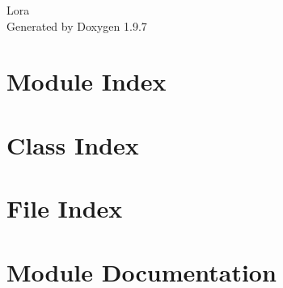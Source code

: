 \documentclass[twoside]{book}
\newcommand{\+}{\discretionary{\mbox{\scriptsize$\hookleftarrow$}}{}{}}
\newcommand{\clearemptydoublepage}{%
    \newpage{\pagestyle{empty}\cleardoublepage}%
  }
\begin{document}
  \raggedbottom
    \hypersetup{pageanchor=false,
                bookmarksnumbered=true,
                pdfencoding=unicode
               }
  \begin{titlepage}
  \vspace*{7cm}
  \begin{center}%
  {\Large Lora}\\
  \vspace*{1cm}
  {\large Generated by Doxygen 1.9.7}\\
  \end{center}
  \end{titlepage}
  \clearemptydoublepage
  \tableofcontents
  \clearemptydoublepage
  \hypersetup{pageanchor=true}



\chapter{Module Index}

\chapter{Class Index}

\chapter{File Index}

\chapter{Module Documentation}




\end{document}
